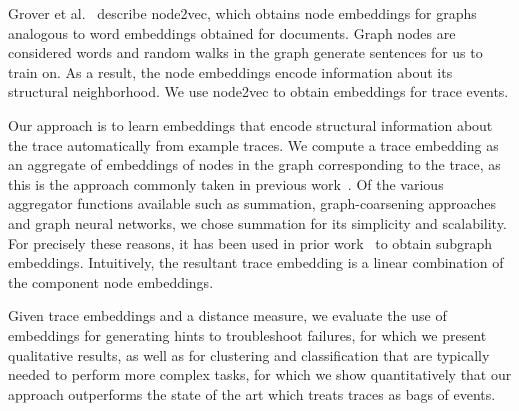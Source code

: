 Grover et al.~\cite{corr18_GroverL16} describe node2vec, which obtains node embeddings for graphs analogous to word embeddings obtained for documents. Graph nodes are considered words and random walks in the graph generate sentences for us to train on. As a result, the node embeddings encode information about its structural neighborhood. We use node2vec to obtain embeddings for trace events.

Our approach is to learn embeddings that encode structural information about the trace automatically from example traces.  We compute a trace embedding as an aggregate of embeddings of nodes in the graph corresponding to the trace, as this is the approach commonly taken in previous work~\cite{corr_2017_abs-1709-05584}. Of the various aggregator functions available such as summation, graph-coarsening approaches and graph neural networks, we chose summation for its simplicity and scalability. For precisely these reasons, it has been used in prior work~\cite{DBLP:journals/corr/DuvenaudMAGHAA15, DBLP:journals/corr/DaiDS16} to obtain subgraph embeddings. Intuitively, the resultant trace embedding is a linear combination of the component node embeddings. 

 Given trace embeddings and a distance measure, we evaluate the use of embeddings for generating hints to troubleshoot failures, for which we present qualitative results, as well as for clustering and classification that are typically needed to perform more complex tasks, for which we show quantitatively that our approach outperforms the state of the art which treats traces as bags of events.